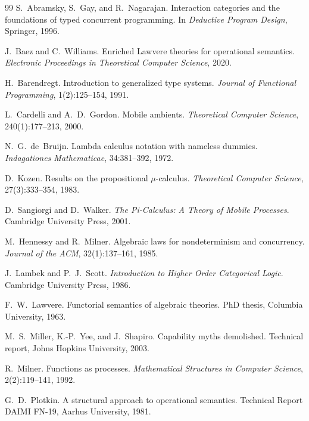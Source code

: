 \begin{thebibliography}{99}
S.~Abramsky, S.~Gay, and R.~Nagarajan.
\newblock Interaction categories and the foundations of typed concurrent programming.
\newblock In \emph{Deductive Program Design}, Springer, 1996.

J.~Baez and C.~Williams.
\newblock Enriched Lawvere theories for operational semantics.
\newblock \emph{Electronic Proceedings in Theoretical Computer Science}, 2020.

H.~Barendregt.
\newblock Introduction to generalized type systems.
\newblock \emph{Journal of Functional Programming}, 1(2):125--154, 1991.

L.~Cardelli and A.~D.~Gordon.
\newblock Mobile ambients.
\newblock \emph{Theoretical Computer Science}, 240(1):177--213, 2000.

N.~G.~de~Bruijn.
\newblock Lambda calculus notation with nameless dummies.
\newblock \emph{Indagationes Mathematicae}, 34:381--392, 1972.

D.~Kozen. \newblock Results on the propositional $\mu$-calculus. \newblock \emph{Theoretical Computer Science}, 27(3):333--354, 1983.

D.~Sangiorgi and D.~Walker. \newblock \emph{The Pi-Calculus: A Theory of Mobile Processes}. \newblock Cambridge University Press, 2001.

M.~Hennessy and R.~Milner.
\newblock Algebraic laws for nondeterminism and concurrency.
\newblock \emph{Journal of the ACM}, 32(1):137--161, 1985.

J.~Lambek and P.~J.~Scott.
\newblock \emph{Introduction to Higher Order Categorical Logic}.
\newblock Cambridge University Press, 1986.

F.~W.~Lawvere.
\newblock Functorial semantics of algebraic theories.
\newblock PhD thesis, Columbia University, 1963.

M.~S.~Miller, K.-P.~Yee, and J.~Shapiro.
\newblock Capability myths demolished.
\newblock Technical report, Johns Hopkins University, 2003.

R.~Milner.
\newblock Functions as processes.
\newblock \emph{Mathematical Structures in Computer Science}, 2(2):119--141, 1992.

G.~D.~Plotkin.
\newblock A structural approach to operational semantics.
\newblock Technical Report DAIMI FN-19, Aarhus University, 1981.


\end{thebibliography}
